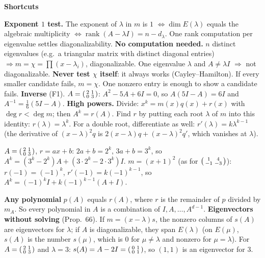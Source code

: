 \documentclass[10pt]{scrartcl}
\newenvironment{shortcuts}{\begin{mdframed}[style=fastboxstyle]\textbf{\color{NavyBlue}Shortcuts}\begin{itemize}[itemsep=2pt,topsep=2pt]}{\end{itemize}\end{mdframed}}
\begin{document}
\begin{shortcuts}
  \ii \textbf{Exponent $1$ test.} The exponent of $\lambda$ in $m$ is $1$ $\iff\dim E(\lambda)$ equals the algebraic multiplicity $\iff\operatorname{rank}(A-\lambda I)=n-d_\lambda$. One rank computation per eigenvalue settles diagonalizability.
  \ii \textbf{No computation needed.} $n$ distinct eigenvalues (e.g.\ a triangular matrix with distinct diagonal entries) $\Rightarrow m=\chi=\prod(x-\lambda_i)$, diagonalizable. One eigenvalue $\lambda$ and $A\ne\lambda I$ $\Rightarrow$ not diagonalizable.
  \ii \textbf{Never test $\chi$ itself}: it always works (Cayley--Hamilton). If every smaller candidate fails, $m=\chi$. One nonzero entry is enough to show a candidate fails.
  \ii \textbf{Inverse} (F1). $A=\begin{psmallmatrix}2&1\\0&3\end{psmallmatrix}$: $A^2-5A+6I=0$, so $A(5I-A)=6I$ and $A^{-1}=\frac16(5I-A)$.
  \ii \textbf{High powers.} Divide: $x^k=m(x)q(x)+r(x)$ with $\deg r<\deg m$; then $A^k=r(A)$. Find $r$ by putting each root $\lambda$ of $m$ into this identity: $r(\lambda)=\lambda^k$. For a double root, differentiate as well: $r'(\lambda)=k\lambda^{k-1}$ (the derivative of $(x-\lambda)^2q$ is $2(x-\lambda)q+(x-\lambda)^2q'$, which vanishes at $\lambda$).
  \begin{itemize}
    \ii $A=\begin{psmallmatrix}2&1\\0&3\end{psmallmatrix}$, $r=ax+b$: $2a+b=2^k$, $3a+b=3^k$, so $A^k=(3^k-2^k)A+(3\cdot2^k-2\cdot3^k)I$.
    \ii $m=(x+1)^2$ (as for $\begin{psmallmatrix}1&4\\-1&-3\end{psmallmatrix}$): $r(-1)=(-1)^k$, $r'(-1)=k(-1)^{k-1}$, so $A^k=(-1)^kI+k(-1)^{k-1}(A+I)$.
  \end{itemize}
  \ii \textbf{Any polynomial} $p(A)$ equals $r(A)$, where $r$ is the remainder of $p$ divided by $m_A$. So every polynomial in $A$ is a combination of $I,A,\dots,A^{d-1}$.
  \ii \textbf{Eigenvectors without solving} (Prop.~66). If $m=(x-\lambda)s$, the nonzero columns of $s(A)$ are eigenvectors for $\lambda$; if $A$ is diagonalizable, they span $E(\lambda)$ (on $E(\mu)$, $s(A)$ is the number $s(\mu)$, which is $0$ for $\mu\ne\lambda$ and nonzero for $\mu=\lambda$). For $A=\begin{psmallmatrix}2&1\\0&3\end{psmallmatrix}$ and $\lambda=3$: $s(A)=A-2I=\begin{psmallmatrix}0&1\\0&1\end{psmallmatrix}$, so $(1,1)$ is an eigenvector for $3$.

\end{shortcuts}
\end{document}
